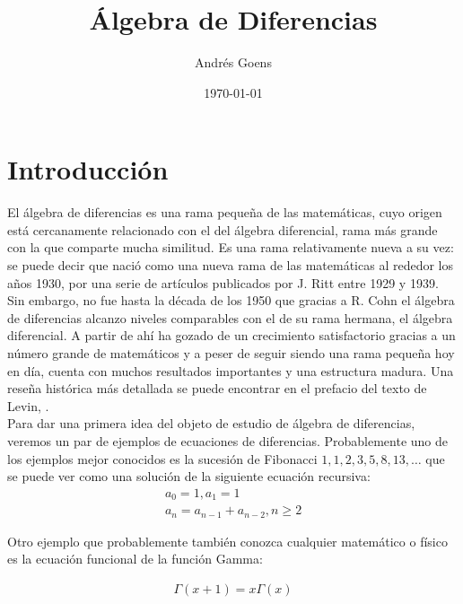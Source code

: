\documentclass[letterpaper]{article}
\title{\'Algebra de Diferencias}
\author{Andr\'{e}s Goens}
\date{\today}
\theoremstyle{definition}
\begin{document}
\maketitle
\section{Introducci\'on}

El \'algebra de diferencias es una rama peque\~na de las matem\'aticas, cuyo origen est\'a cercanamente relacionado con el del \'algebra diferencial, rama m\'as grande con la que comparte mucha similitud. Es una rama relativamente nueva a su vez: 
se puede decir que naci\'o como una nueva rama de las matem\'aticas al rededor los a\~nos 1930, por una serie de art\'iculos publicados por J. Ritt entre 1929 y 1939. Sin embargo, no fue hasta la d\'ecada de los 1950 que gracias a R. Cohn 
el \'algebra de diferencias alcanzo niveles comparables con el de su rama hermana, el \'algebra diferencial. A partir de ah\'i ha gozado de un crecimiento satisfactorio gracias a un n\'umero grande de matem\'aticos y a peser
 de seguir siendo una rama peque\~na hoy en d\'ia, cuenta con muchos resultados importantes y una estructura madura. Una rese\~na hist\'orica m\'as detallada se puede encontrar en el prefacio del texto de Levin, \cite{levin}.
\\

Para dar una primera idea del objeto de estudio de \'algebra de diferencias, veremos un par de ejemplos de ecuaciones de diferencias. Probablemente uno de los ejemplos mejor conocidos es la sucesi\'on de Fibonacci $1,1,2,3,5,8,13,\ldots$ que se puede ver como una soluci\'on de la siguiente ecuaci\'on recursiva: 
\begin{align*}
a_0 = 1,  a_1 = 1 \\ a_n = a_{n-1} + a_{n-2}, n\geq 2
\end{align*}

Otro ejemplo que probablemente tambi\'en conozca cualquier matem\'atico o f\'isico es la ecuaci\'on funcional de la funci\'on Gamma:

\begin{align*}
\Gamma(x+1) = x \Gamma(x)
\end{align*}
\end{document}
